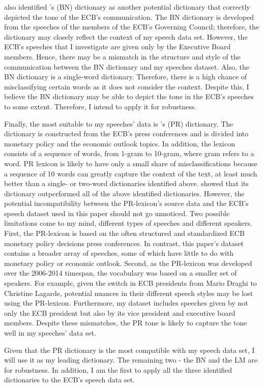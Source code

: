 \textcite{baranowski2021} also identified \textcite{bennani2017}’s (BN) dictionary as another potential dictionary that correctly depicted the tone of the ECB’s communication. The BN dictionary is developed from the speeches of the members of the ECB’s Governing Council; therefore, the dictionary may closely reflect the context of my speech data set. However, the ECB’s speeches that I investigate are given only by the Executive Board members. Hence, there may be a mismatch in the structure and style of the communication between the BN dictionary and my speeches dataset. Also, the BN dictionary is a single-word dictionary. Therefore, there is a high chance of misclassifying certain words as it does not consider the context. Despite this, I believe the BN dictionary may be able to depict the tone in the ECB’s speeches to some extent. Therefore, I intend to apply it for robustness.


Finally, the most suitable to my speeches’ data is \textcite{picault2017}’s (PR) dictionary. The dictionary is constructed from the ECB’s press conferences and is divided into monetary policy and the economic outlook topics. In addition, the lexicon consists of a sequence of words, from 1-gram to 10-gram, where gram refers to a word. PR lexicon is likely to have only a small share of misclassifications because a sequence of 10 words can greatly capture the context of the text, at least much better than a single- or two-word dictionaries identified above. \textcite{picault2017} showed that its dictionary outperformed all of the above identified  dictionaries. However, the potential incompatibility between the PR-lexicon’s source data and the ECB's speech dataset used in this paper should not go unnoticed. Two possible limitations come to my mind, different types of speeches and different speakers. First, the PR-lexicon is based on the often structured and standardized ECB monetary policy decisions press conferences. In contrast, this paper’s dataset contains a broader array of speeches, some of which have little to do with monetary policy or economic outlook. Second, as the PR-lexicon was developed over the 2006-2014 timespan, the vocabulary was based on a smaller set of speakers. For example, given the switch in ECB presidents from Mario Draghi to Christine Lagarde, potential nuances in their different speech styles may be lost using the PR-lexicon. Furthermore, my dataset includes speeches given by not only the ECB president but also by its vice president and executive board members. Despite these mismatches, the PR tone is likely to capture the tone well in my speeches’ data set.


Given that the PR dictionary is the most compatible with my speech data set, I will use it as my leading dictionary. The remaining two - the BN and the LM are for robustness. In addition, I am the first to apply all the three identified dictionaries to the ECB’s speech data set. 

